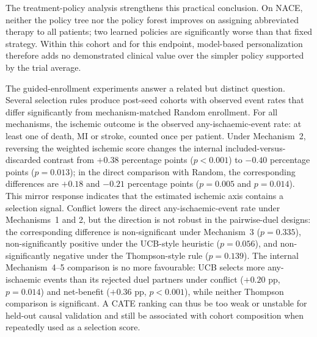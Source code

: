The treatment-policy analysis strengthens this practical conclusion. On NACE, neither
the policy tree nor the policy forest improves on assigning abbreviated therapy to all
patients; two learned policies are significantly worse than that fixed strategy. Within
this cohort and for this endpoint, model-based personalization therefore adds no
demonstrated clinical value over the simpler policy supported by the trial average.

\vspace{10pt}

The guided-enrollment experiments answer a related but distinct question. Several
selection rules produce post-seed cohorts with observed event rates that differ
significantly from mechanism-matched Random enrollment. For all mechanisms, the
ischemic outcome is the observed any-ischaemic-event rate: at least one of death, MI or
stroke, counted once per patient. Under Mechanism~2, reversing the weighted ischemic
score changes the internal included-versus-discarded contrast from $+0.38$ percentage
points ($p<0.001$) to $-0.40$ percentage points ($p=0.013$); in the direct comparison
with Random, the corresponding differences are $+0.18$ and $-0.21$ percentage points
($p=0.005$ and $p=0.014$). This mirror response indicates that the estimated ischemic
axis contains a selection signal. Conflict lowers the direct any-ischaemic-event rate
under Mechanisms~1 and 2, but the direction is not robust in the pairwise-duel designs:
the corresponding difference is non-significant under Mechanism~3 ($p=0.335$),
non-significantly positive under the UCB-style heuristic ($p=0.056$), and
non-significantly negative under the Thompson-style rule ($p=0.139$). The internal
Mechanism~4--5 comparison is no more favourable: UCB selects more any-ischaemic events
than its rejected duel partners under conflict ($+0.20$ pp, $p=0.014$) and net-benefit
($+0.36$ pp, $p<0.001$), while neither Thompson comparison is significant. A CATE
ranking can thus be too weak or unstable for held-out causal validation and still be
associated with cohort composition when repeatedly used as a selection score.

\vspace{10pt}

